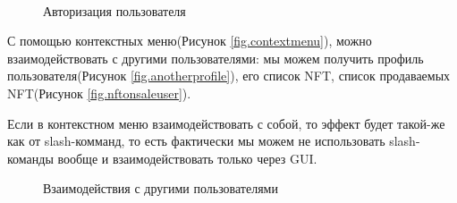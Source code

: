 \begin{figure}
    \centering
    \\
    \caption{Авторизация пользователя}
\end{figure}

С помощью контекстных меню(Рисунок {\color{blue} \ref{fig.contextmenu}}), можно взаимодействовать с другими пользователями: мы можем получить профиль пользователя(Рисунок {\color{blue} \ref{fig.anotherprofile}}), его список NFT, список продаваемых NFT(Рисунок {\color{blue} \ref{fig.nftonsaleuser}}).

\begin{remark}
    Если в контекстном меню взаимодействовать с собой, то эффект будет такой-же как от slash-комманд, то есть фактически мы можем не использовать slash-команды вообще и взаимодействовать только через GUI.
\end{remark}

\begin{figure}[H]
    \centering
    \caption{Взаимодействия с другими пользователями}
\end{figure}

